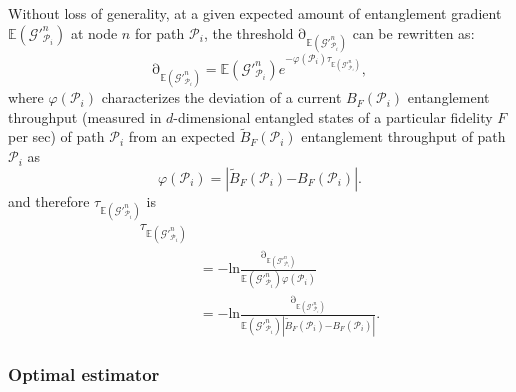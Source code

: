 \documentclass[11pt]{article}%
\begin{document}
 Without loss of generality, at a given expected amount of entanglement gradient $\mathbb{E}\left({\mathcal{G}}'^n_{{\mathcal{P}}_i}\right)$ at node $n$ for path ${\mathcal{P}}_i$, the threshold ${\mathrm{\partial }}_{\mathbb{E}\left({\mathcal{G}}'^n_{{\mathcal{P}}_i}\right)}$ can be rewritten as:
\begin{equation} \label{ZEqnNum478550} 
{\mathrm{\partial }}_{\mathbb{E}\left({\mathcal{G}}'^n_{{\mathcal{P}}_i}\right)}\mathrm{=}\mathbb{E}\left({\mathcal{G}}'^n_{{\mathcal{P}}_i}\right)e^{\mathrm{-}\varphi \left({\mathcal{P}}_i\right){\tau }_{\mathbb{E}\left({\mathcal{G}}'^n_{{\mathcal{P}}_i}\right)}}, 
\end{equation} 
where $\varphi \left({\mathcal{P}}_i\right)$ characterizes the deviation of a current $B_F\left({\mathcal{P}}_i\right)$ entanglement throughput (measured in $d$-dimensional entangled states of a particular fidelity $F$ per sec) of path ${\mathcal{P}}_i$ from an expected ${\tilde{B}}_F\left({\mathcal{P}}_i\right)$ entanglement throughput of path ${\mathcal{P}}_i$ as
\begin{equation} \label{ZEqnNum645414} 
\varphi \left({\mathcal{P}}_i\right)\mathrm{=}\left|{\tilde{B}}_F\left({\mathcal{P}}_i\right)\mathrm{-}B_F\left({\mathcal{P}}_i\right)\right|.                                                                  
\end{equation} 
and therefore ${\tau }_{\mathbb{E}\left({\mathcal{G}}'^n_{{\mathcal{P}}_i}\right)}$ is
\begin{equation} \label{ZEqnNum763249} 
\begin{split}
{\tau }_{\mathbb{E}\left({\mathcal{G}}'^n_{{\mathcal{P}}_i}\right)}\\&\mathrm{=-ln}\frac{{\mathrm{\partial }}_{\mathbb{E}\left({\mathcal{G}}'^n_{{\mathcal{P}}_i}\right)}}{\mathbb{E}\left({\mathcal{G}}'^n_{{\mathcal{P}}_i}\right)\varphi \left({\mathcal{P}}_i\right)}\\&\mathrm{=-ln}\frac{{\mathrm{\partial }}_{\mathbb{E}\left({\mathcal{G}}'^n_{{\mathcal{P}}_i}\right)}}{\mathbb{E}\left({\mathcal{G}}'^n_{{\mathcal{P}}_i}\right)\left|{\tilde{B}}_F\left({\mathcal{P}}_i\right)\mathrm{-}B_F\left({\mathcal{P}}_i\right)\right|}.                                             
\end{split}
\end{equation} 
 
\subsubsection{Optimal estimator}
\end{document}
